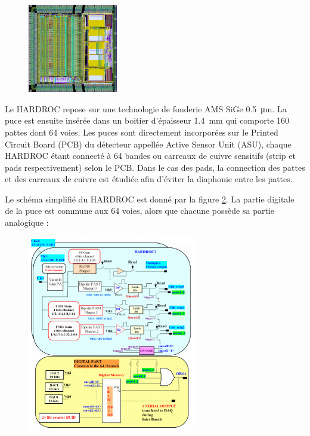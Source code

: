 \begin{figure}[ht!]
	\centering
	\includegraphics[width=0.35\textwidth]{GLA/HARDROC.png}
	\label{hardroc}
\end{figure}

Le HARDROC repose sur une technologie de fonderie AMS SiGe \SI{0.5}{\micro\meter}. La puce est ensuite insérée dans un boitier d'épaisseur \SI{1.4}{\milli\meter} qui comporte \num{160} pattes dont \num{64} voies. Les puces sont directement incorporées sur le Printed Circuit Board (PCB) du détecteur appellée Active Sensor Unit (ASU), chaque HARDROC étant connecté à \num{64} bandes ou carreaux de cuivre sensitifs (strip et pads respectivement) selon le PCB. Dans le cas des pads, la connection des pattes et des carreaux de cuivre est étudiée afin d'éviter la diaphonie entre les pattes.

Le schéma simplifié du HARDROC est donné par la figure \ref{scheme}. La partie digitale de la puce est commune aux \num{64} voies, alors que chacune possède sa partie analogique :

\begin{figure}[ht!]
	\centering
	\includegraphics[width=0.65\textwidth]{GLA/scheme.png}
	\label{scheme}
\end{figure}


